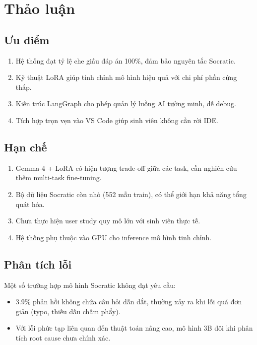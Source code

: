 \section{Thảo luận}

\subsection{Ưu điểm}

\begin{enumerate}
    \item Hệ thống đạt tỷ lệ che giấu đáp án 100\%, đảm bảo nguyên tắc Socratic.
    \item Kỹ thuật LoRA giúp tinh chỉnh mô hình hiệu quả với chi phí phần cứng thấp.
    \item Kiến trúc LangGraph cho phép quản lý luồng AI tường minh, dễ debug.
    \item Tích hợp trọn vẹn vào VS Code giúp sinh viên không cần rời IDE.
\end{enumerate}

\subsection{Hạn chế}

\begin{enumerate}
    \item Gemma-4 + LoRA có hiện tượng trade-off giữa các task, cần nghiên cứu thêm multi-task fine-tuning.
    \item Bộ dữ liệu Socratic còn nhỏ (552 mẫu train), có thể giới hạn khả năng tổng quát hóa.
    \item Chưa thực hiện user study quy mô lớn với sinh viên thực tế.
    \item Hệ thống phụ thuộc vào GPU cho inference mô hình tinh chỉnh.
\end{enumerate}

\subsection{Phân tích lỗi}


Một số trường hợp mô hình Socratic không đạt yêu cầu:
\begin{itemize}
    \item 3.9\% phản hồi không chứa câu hỏi dẫn dắt, thường xảy ra khi lỗi quá đơn giản (typo, thiếu dấu chấm phẩy).
    \item Với lỗi phức tạp liên quan đến thuật toán nâng cao, mô hình 3B đôi khi phân tích root cause chưa chính xác.
\end{itemize}
